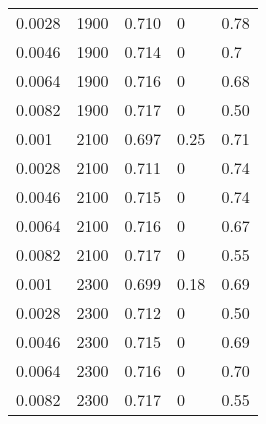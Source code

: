 \begin{table}[tbp]
\begin{center}
\begin{tabular}{lllll}
\num{0,0028} & \num{1900} & \num{0,710} & \num{0}    & \num{0,78}\\
\num{0,0046} & \num{1900} & \num{0,714} & \num{0}    & \num{0,7}\\
\num{0,0064} & \num{1900} & \num{0,716} & \num{0}    & \num{0,68}\\
\num{0,0082} & \num{1900} & \num{0,717} & \num{0}    & \num{0,50}\\
\num{0,001}  & \num{2100} & \num{0,697} & \num{0,25} & \num{0,71}\\
\num{0,0028} & \num{2100} & \num{0,711} & \num{0}    & \num{0,74}\\
\num{0,0046} & \num{2100} & \num{0,715} & \num{0}    & \num{0,74}\\
\num{0,0064} & \num{2100} & \num{0,716} & \num{0}    & \num{0,67}\\
\num{0,0082} & \num{2100} & \num{0,717} & \num{0}    & \num{0,55}\\
\num{0,001}  & \num{2300} & \num{0,699} & \num{0,18} & \num{0,69}\\
\num{0,0028} & \num{2300} & \num{0,712} & \num{0}    & \num{0,50}\\
\num{0,0046} & \num{2300} & \num{0,715} & \num{0}    & \num{0,69}\\
\num{0,0064} & \num{2300} & \num{0,716} & \num{0}    & \num{0,70}\\
\num{0,0082} & \num{2300} & \num{0,717} & \num{0}    & \num{0,55}\\
  \hline
  \end{tabular}
  \end{center}
\end{table}

